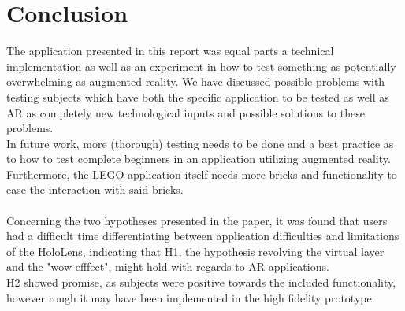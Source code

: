 
\section{Conclusion}
The application presented in this report was equal parts a technical implementation as well as an experiment in how to test something as potentially overwhelming as augmented reality. We have discussed possible problems with testing subjects which have both the specific application to be tested as well as AR as completely new technological inputs and possible solutions to these problems.\\
In future work, more (thorough) testing needs to be done and a best practice as to how to test complete beginners in an application utilizing augmented reality. Furthermore, the LEGO application itself needs more bricks and functionality to ease the interaction with said bricks. \\
\\
Concerning the two hypotheses presented in the paper, it was found that users had a difficult time differentiating between application difficulties and limitations of the HoloLens, indicating that H1, the hypothesis revolving the virtual layer and the "wow-efffect", might hold with regards to AR applications.\\
H2 showed promise, as subjects were positive towards the included functionality, however rough it may have been implemented in the high fidelity prototype. 